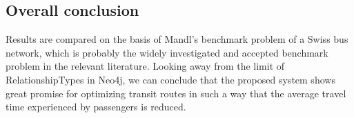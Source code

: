 \subsection*{Overall conclusion}

Results are compared on the basis of Mandl's benchmark problem of a Swiss bus network, which is probably the widely investigated and accepted benchmark problem in the relevant literature. Looking away from the limit of RelationshipTypes in Neo4j, we can conclude that the proposed system shows great promise for optimizing transit routes in such a way that the average travel time experienced by passengers is reduced. 









